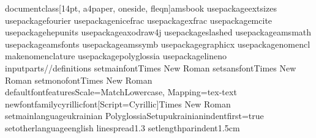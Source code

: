 \ d o c u m e n t c l a s s [ 1 4 p t ,   a 4 p a p e r ,   o n e s i d e ,   f l e q n ] { a m s b o o k } 
 %
 \ u s e p a c k a g e { e x t s i z e s } %
 \ u s e p a c k a g e { f o u r i e r } %
 %
 \ u s e p a c k a g e { n i c e f r a c } %
 \ u s e p a c k a g e { x f r a c } %
 \ u s e p a c k a g e { m c i t e } 
 \ u s e p a c k a g e { h e p u n i t s } 
 %
 \ u s e p a c k a g e { a x o d r a w 4 j } %
 %
 \ u s e p a c k a g e { s l a s h e d } 
 %
 \ u s e p a c k a g e { a m s m a t h } %
 \ u s e p a c k a g e { a m s f o n t s } %
 \ u s e p a c k a g e { a m s s y m b } %
 \ u s e p a c k a g e { g r a p h i c x } %
 %
 %
 \ u s e p a c k a g e { n o m e n c l } 
 \ m a k e n o m e n c l a t u r e         %
 %
 \ u s e p a c k a g e { p o l y g l o s s i a }     %
 %
 \ u s e p a c k a g e { l i n e n o } 
 %
 %
 \ i n p u t { p a r t s / / d e f i n i t i o n s } 
 %
 \ s e t m a i n f o n t { T i m e s   N e w   R o m a n }     %
 \ s e t s a n s f o n t { T i m e s   N e w   R o m a n }     %
 \ s e t m o n o f o n t { T i m e s   N e w   R o m a n }     %
 %
 %
 %
 %
 \ d e f a u l t f o n t f e a t u r e s { S c a l e = M a t c h L o w e r c a s e ,   M a p p i n g = t e x - t e x t }     %
 \ n e w f o n t f a m i l y \ c y r i l l i c f o n t [ S c r i p t = C y r i l l i c ] { T i m e s   N e w   R o m a n } 
 \ s e t m a i n l a n g u a g e { u k r a i n i a n }     %
 \ P o l y g l o s s i a S e t u p { u k r a i n i a n } { i n d e n t f i r s t = t r u e } 
 \ s e t o t h e r l a n g u a g e { e n g l i s h } 
 %
 \ l i n e s p r e a d { 1 . 3 }   %
 \ s e t l e n g t h { \ p a r i n d e n t } { 1 . 5 c m }   %
